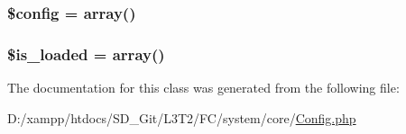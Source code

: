 \subsubsection[{\$config}]{\setlength{\rightskip}{0pt plus 5cm}\$config = array()}\label{class_c_i___config_a49c7011be9c979d9174c52a8b83e5d8e}
\hypertarget{class_c_i___config_a908e9ad52a5d1956d360689452f6bdbe}{}
\subsubsection[{\$is\+\_\+loaded}]{\setlength{\rightskip}{0pt plus 5cm}\$is\+\_\+loaded = array()}\label{class_c_i___config_a908e9ad52a5d1956d360689452f6bdbe}


The documentation for this class was generated from the following file\+:\begin{DoxyCompactItemize}
\item 
D\+:/xampp/htdocs/\+S\+D\+\_\+\+Git/\+L3\+T2/\+F\+C/system/core/\hyperlink{system_2core_2config_8php}{Config.\+php}\end{DoxyCompactItemize}
